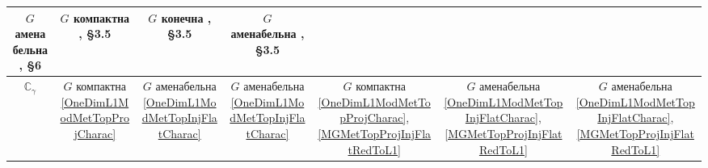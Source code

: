\documentclass{article}
\numberwithin{equation}{section}
\theoremstyle{plain}
\theoremstyle{definition}
\begin{document}
\begin{fulltext}
\begin{table}[ht]
\begin{tiny}
{\begin{tabular}{|c|c|c|c|c|c|c|}
                \shortstack{
                    $G$ аменабельна \\
					{\cite{DalPolHomolPropGrAlg}, \S 6}
                } & 
                \shortstack{
                    $G$ компактна \\
					{\cite{RamsHomPropSemgroupAlg}, \S 3.5}
                } & 
                \shortstack{
                    $G$ конечна \\
					{\cite{RamsHomPropSemgroupAlg}, \S 3.5}
                } & 
                \shortstack{
                    $G$ аменабельна \\
					{\cite{RamsHomPropSemgroupAlg}, \S 3.5}
                } \\ 
            \hline
                $\mathbb{C}_\gamma$ & 
                \shortstack{
                    $G$ компактна \\ 
                   {\ref{OneDimL1ModMetTopProjCharac}}
                } & 
                \shortstack{
                    $G$ аменабельна \\ 
                   {\ref{OneDimL1ModMetTopInjFlatCharac}}
                } & 
                \shortstack{
                    $G$ аменабельна \\ 
                   {\ref{OneDimL1ModMetTopInjFlatCharac}}
                } & 
                \shortstack{
                    $G$ компактна \\ 
                   {\ref{OneDimL1ModMetTopProjCharac}},
                   {\ref{MGMetTopProjInjFlatRedToL1}}
                } & 
                \shortstack{
                    $G$ аменабельна \\ 
                   {\ref{OneDimL1ModMetTopInjFlatCharac}},
                   {\ref{MGMetTopProjInjFlatRedToL1}}
                } & 
                \shortstack{
                    $G$ аменабельна \\ 
                   {\ref{OneDimL1ModMetTopInjFlatCharac}},
                   {\ref{MGMetTopProjInjFlatRedToL1}}
                } \\                   
            \hline
            \end{tabular}
        }
    \end{tiny}\label{HomolTrivModMetTh}
\end{table}


\end{fulltext}
\end{document}
